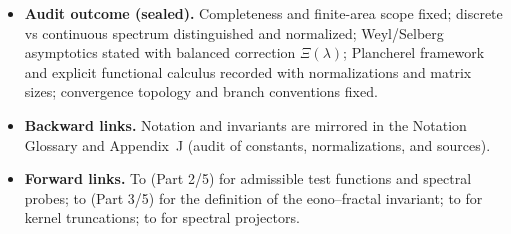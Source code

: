 \begin{itemize}
  \item \textbf{Audit outcome (sealed).}
  Completeness and finite-area scope fixed; discrete vs continuous spectrum distinguished and normalized; Weyl/Selberg asymptotics stated with balanced correction $\Xi(\lambda)$; Plancherel framework and explicit functional calculus recorded with normalizations and matrix sizes; convergence topology and branch conventions fixed.

  \item \textbf{Backward links.}
  Notation and invariants are mirrored in the Notation Glossary and Appendix~J (audit of constants, normalizations, and sources).

  \item \textbf{Forward links.}
  To  (Part 2/5) for admissible test functions and spectral probes;
  to  (Part 3/5) for the definition of the eono–fractal invariant;
  to  for kernel truncations; to  for spectral projectors.
\end{itemize}



